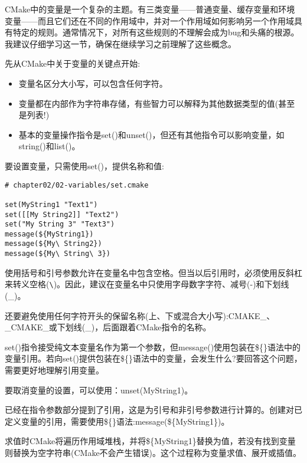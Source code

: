 
CMake中的变量是一个复杂的主题。有三类变量——普通变量、缓存变量和环境变量——而且它们还在不同的作用域中，并对一个作用域如何影响另一个作用域具有特定的规则。通常情况下，对所有这些规则的不理解会成为bug和头痛的根源。我建议仔细学习这一节，确保在继续学习之前理解了这些概念。

先从CMake中关于变量的关键点开始:

\begin{itemize}
\item 
变量名区分大小写，可以包含任何字符。

\item 
变量都在内部作为字符串存储，有些智力可以解释为其他数据类型的值(甚至是列表!)

\item 
基本的变量操作指令是set()和unset()，但还有其他指令可以影响变量，如string()和list()。
\end{itemize}

要设置变量，只需使用set()，提供名称和值:

\begin{lstlisting}[style=styleCMake]
# chapter02/02-variables/set.cmake

set(MyString1 "Text1")
set([[My String2]] "Text2")
set("My String 3" "Text3")
message(${MyString1})
message(${My\ String2})
message(${My\ String\ 3})
\end{lstlisting}

使用括号和引号参数允许在变量名中包含空格。但当以后引用时，必须使用反斜杠来转义空格(\verb|\|)。因此，建议在变量名中只使用字母数字字符、减号(-)和下划线(\_)。

还要避免使用任何字符开头的保留名称(上、下或混合大小写):CMAKE\_、\_CMAKE\_或下划线(\_)，后面跟着CMake指令的名称。

\begin{tcolorbox}[colback=blue!5!white,colframe=blue!75!black,title=Note]
set()指令接受纯文本变量名作为第一个参数，但message()使用包装在\$\{\}语法中的变量引用。若向set()提供包装在\$\{\}语法中的变量，会发生什么?要回答这个问题，需要更好地理解引用变量。
\end{tcolorbox}

要取消变量的设置，可以使用：unset(MyString1)。


已经在指令参数部分提到了引用，这是为引号和非引号参数进行计算的。创建对已定义变量的引用，需要使用\$\{\}语法:message(\$\{MyString1\})。

求值时CMake将遍历作用域堆栈，并将\$\{MyString1\}替换为值，若没有找到变量则替换为空字符串(CMake不会产生错误)。这个过程称为变量求值、展开或插值。

